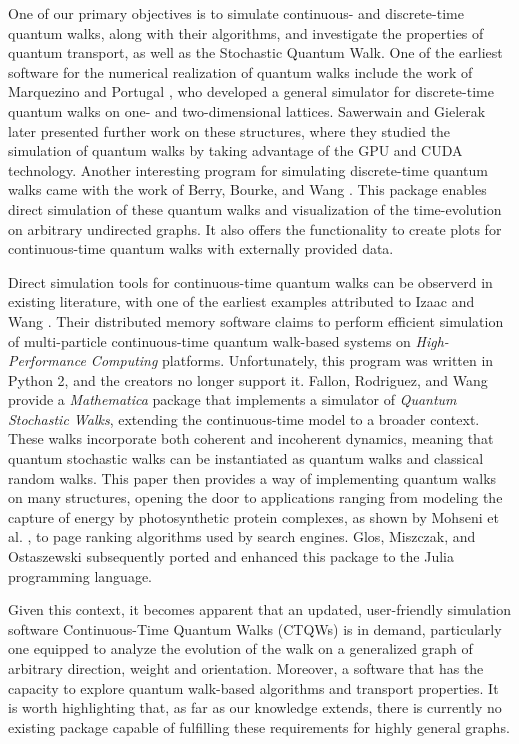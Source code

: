 \documentclass[../../main.tex]{subfiles}
\begin{document}
One of our primary objectives is to simulate continuous- and discrete-time
quantum walks, along with their algorithms, and investigate the properties of
quantum transport, as well as the Stochastic Quantum Walk. One of the earliest
software for the numerical realization of quantum walks include the work of
Marquezino and Portugal \cite{marquezino2008}, who developed a general
simulator for discrete-time quantum walks on one- and two-dimensional lattices.
Sawerwain and Gielerak \cite{sawerwain2010} later presented further work on
these structures, where they studied the simulation of quantum walks by taking
advantage of the GPU and CUDA technology. Another interesting program for
simulating discrete-time quantum walks came with the work of Berry, Bourke, and
Wang \cite{berry2011}. This package enables direct simulation of these quantum
walks and visualization of the time-evolution on arbitrary undirected graphs.
It also offers the functionality to create plots for continuous-time quantum
walks with externally provided data.\par 

Direct simulation tools for continuous-time quantum walks can be observerd in
existing literature, with one of the earliest examples attributed to Izaac and
Wang \cite{izaac2015}. Their distributed memory software claims to perform
efficient simulation of multi-particle continuous-time quantum walk-based
systems on \textit{High-Performance Computing} platforms. Unfortunately, this
program was written in Python 2, and the creators no longer support it.
Fallon, Rodriguez, and Wang \cite{falloon2017a} provide a \textit{Mathematica}
package that implements a simulator of \textit{Quantum Stochastic Walks},
extending the continuous-time model to a broader context. These walks
incorporate both coherent and incoherent dynamics, meaning that quantum
stochastic walks can be instantiated as quantum walks and classical random
walks. This paper then provides a way of implementing quantum walks on many
structures, opening the door to applications ranging from modeling the capture
of energy by photosynthetic protein complexes, as shown by Mohseni et al.
\cite{mohseni08}, to page ranking algorithms used by search engines. Glos,
Miszczak, and Ostaszewski \cite{glos2018} subsequently ported and enhanced this
package to the Julia programming language. \par

Given this context, it becomes apparent that an updated, user-friendly
simulation software Continuous-Time Quantum Walks (CTQWs) is in demand,
particularly one equipped to analyze the evolution of the walk on a generalized
graph of arbitrary direction, weight and orientation. Moreover, a software that
has the capacity to explore quantum walk-based algorithms and transport
properties. It is worth highlighting that, as far as our knowledge extends,
there is currently no existing package capable of fulfilling these requirements
for highly general graphs. \par
\end{document}
